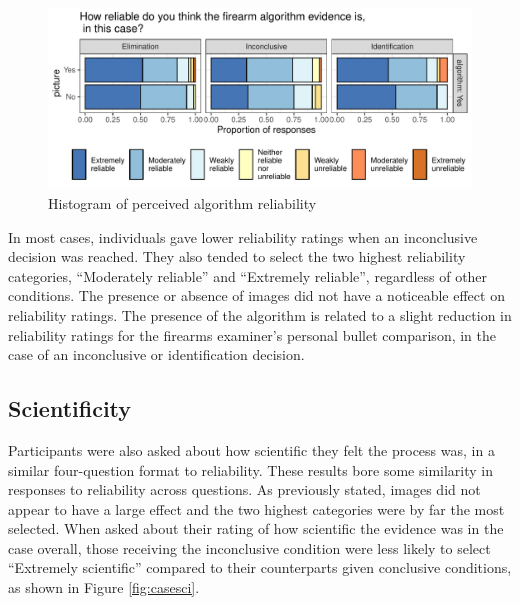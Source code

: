 \documentclass[print]{nuthesis}
\begin{document}
\begin{figure}

{\centering \includegraphics[width=\linewidth]{thesis_files/figure-latex/algrel-1} 

}

\caption{Histogram of perceived algorithm reliability}\label{fig:algrel}
\end{figure}

In most cases, individuals gave lower reliability ratings when an inconclusive decision was reached.
They also tended to select the two highest reliability categories, ``Moderately reliable'' and ``Extremely reliable'', regardless of other conditions.
The presence or absence of images did not have a noticeable effect on reliability ratings.
The presence of the algorithm is related to a slight reduction in reliability ratings for the firearms examiner's personal bullet comparison, in the case of an inconclusive or identification decision.

\hypertarget{scientificity}{%
\subsection{Scientificity}\label{scientificity}}

Participants were also asked about how scientific they felt the process was, in a similar four-question format to reliability.
These results bore some similarity in responses to reliability across questions.
As previously stated, images did not appear to have a large effect and the two highest categories were by far the most selected.
When asked about their rating of how scientific the evidence was in the case overall, those receiving the inconclusive condition were less likely to select ``Extremely scientific'' compared to their counterparts given conclusive conditions, as shown in Figure \ref{fig:casesci}.
\end{document}
